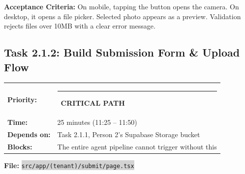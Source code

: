 \documentclass[11pt, a4paper]{article}
\newcommand{\critical}{\textcolor{critred}{\rule{6pt}{6pt}}~\textcolor{critred}{\scriptsize\textbf{CRITICAL PATH}}}
\newcommand{\code}[1]{\texttt{\small\colorbox{lightgray}{#1}}}
\begin{document}
\textbf{Acceptance Criteria:} On mobile, tapping the button opens the camera. On desktop, it opens a file picker. Selected photo appears as a preview. Validation rejects files over 10MB with a clear error message.

\vspace{1em}

\subsection{Task 2.1.2: Build Submission Form \& Upload Flow}

\begin{tabularx}{\textwidth}{lX}
\textbf{Priority:} & \critical \\
\textbf{Time:} & 25 minutes (11:25 -- 11:50) \\
\textbf{Depends on:} & Task 2.1.1, Person 2's Supabase Storage bucket \\
\textbf{Blocks:} & The entire agent pipeline cannot trigger without this \\
\end{tabularx}

\vspace{0.3em}

\textbf{File:} \code{src/app/(tenant)/submit/page.tsx}
\end{document}
